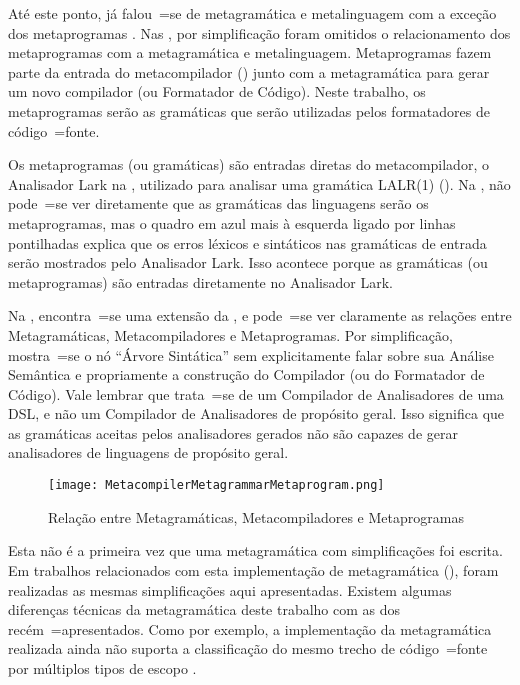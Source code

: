 Até este ponto,
já falou~=se de metagramática e
metalinguagem com a exceção dos metaprogramas \cite{tradeoffsInMetaprogramming}.
Nas ,
por simplificação foram omitidos o relacionamento dos metaprogramas com a metagramática e
metalinguagem.
Metaprogramas fazem parte da entrada do metacompilador () junto com a metagramática para gerar um novo compilador (ou Formatador de Código).
Neste trabalho,
os metaprogramas serão as gramáticas que serão utilizadas pelos formatadores de código~=fonte.

Os metaprogramas (ou gramáticas) são entradas diretas do metacompilador,
o Analisador Lark na ,
utilizado para analisar uma gramática LALR(1) ().
Na ,
não pode~=se ver diretamente que as gramáticas das linguagens serão os metaprogramas,
mas o quadro em azul mais à esquerda ligado por linhas pontilhadas explica que os erros léxicos e
sintáticos nas gramáticas de entrada serão mostrados pelo Analisador Lark.
Isso acontece porque as gramáticas (ou metaprogramas) são entradas diretamente no Analisador Lark.

Na ,
encontra~=se uma extensão da ,
e pode~=se ver claramente as relações entre Metagramáticas,
Metacompiladores e Metaprogramas. Por simplificação,
mostra~=se o nó ``Árvore Sintática'' sem explicitamente falar sobre sua Análise Semântica e
propriamente a construção do Compilador (ou do Formatador de Código).
Vale lembrar que trata~=se de um Compilador de Analisadores de uma DSL,
e não um Compilador de Analisadores de propósito geral.
Isso significa que as gramáticas aceitas pelos analisadores gerados não são capazes de gerar analisadores de linguagens de propósito geral.
\begin{figure}[!htb]
\caption{Relação entre Metagramáticas, Metacompiladores e Metaprogramas}
\label{MetacompilerMetagrammarMetaprogram}
\centering
\texttt{[image: MetacompilerMetagrammarMetaprogram.png]}
\end{figure}

Esta não é a primeira vez que uma metagramática com simplificações foi escrita.
Em trabalhos relacionados com esta implementação de metagramática (),
foram realizadas as mesmas simplificações aqui apresentadas.
Existem algumas diferenças técnicas da metagramática deste trabalho com as dos recém~=apresentados.
Como por exemplo,
a implementação da metagramática realizada ainda não suporta a classificação do mesmo trecho de código~=fonte por múltiplos tipos de escopo \cite{vsCodeSyntaxHighlighthing}.

